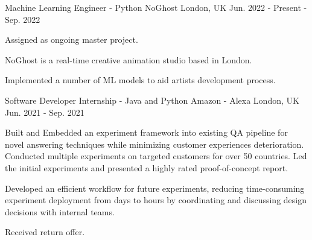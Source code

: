 

\begin{cventries}
  \cventry
  {Machine Learning Engineer - Python} %
  {NoGhost} %
  {London, UK} %
  {Jun. 2022 - Present - Sep. 2022} %
  {
    \begin{cvitems} %
      \item {Assigned as ongoing master project.}
      \item {NoGhost is a real-time creative animation studio based in London.}
      \item {Implemented a number of ML models to aid artists development process.}
    \end{cvitems}
  }

  \cventry
    {Software Developer Internship - Java and Python} %
    {Amazon - Alexa} %
    {London, UK} %
    {Jun. 2021 - Sep. 2021} %
    {
      \begin{cvitems} %
        \item {Built and Embedded an experiment framework into existing QA pipeline for novel answering techniques while minimizing customer experiences deterioration. Conducted multiple experiments on targeted customers for over 50 countries. Led the initial experiments and presented a highly rated proof-of-concept report.}
        \item {Developed an efficient workflow for future experiments, reducing time-consuming experiment deployment from days to hours by coordinating and discussing design decisions with internal teams.}
        \item {Received return offer.}
      \end{cvitems}
    }


\end{cventries}
